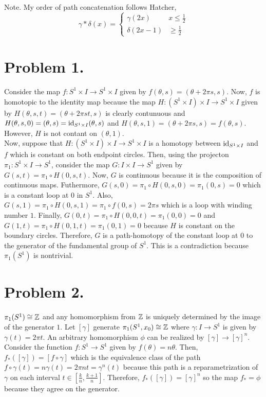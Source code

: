 \documentclass[12pt]{extarticle}
\begin{document}

Note. My order of path concatenation follows Hatcher,
\[\gamma * \delta(x) = \begin{cases}
\gamma(2x) & x \le \tfrac{1}{2} \\
\delta(2x - 1) & \ge \tfrac{1}{2}
\end{cases}\]
 
\section*{Problem 1.}
Consider the map $f : S^1 \times I \to S^1 \times I$ given by $f(\theta, s) = (\theta + 2 \pi s, s)$. Now, $f$ is homotopic to the identity map because the map $H : (S^1 \times I) \times I \to S^1 \times I$ given by $H(\theta, s, t) = (\theta + 2\pi st, s)$ is clearly contunuous and $H(\theta, s, 0) = (\theta, s) = \mathrm{id}_{S^1 \times I}(\theta, s)$ and $H(\theta, s, 1) = (\theta + 2 \pi s, s) = f(\theta, s)$. However, $H$ is not contant on $(\theta, 1)$. \bigskip \\
Now, suppose that $H : (S^1 \times I) \times I \to S^1 \times I$ is a homotopy between $\mathrm{id}_{S^1 \times I}$ and $f$ which is constant on both endpoint circles. Then, using the projecton $\pi_1 : S^1 \times I \to S^1$, consider the map $G : I \times I \to S^1$ given by $G(s, t) = \pi_1 \circ H(0, s, t)$. Now, $G$ is continuous because it is the composition of continuous maps. Futhermore, $G(s, 0) = \pi_1 \circ H(0, s, 0) = \pi_1(0, s) = 0$ which is a constant loop at $0$ in $S^1$. Also, $G(s, 1) = \pi_1 \circ H(0, s, 1) = \pi_1 \circ f(0, s) = 2 \pi s$ which is a loop with winding number $1$. Finally, $G(0, t) = \pi_1 \circ H(0, 0, t) = \pi_1(0, 0) = 0$ and $G(1, t) = \pi_1 \circ H(0, 1, t) = \pi_1(0, 1) = 0$ because $H$ is constant on the boundary circles. Therefore, $G$ is a path-homotopy of the constant loop at $0$ to the generator of the fundamental group of $S^1$. This is a contradiction because $\pi_1(S^1)$ is nontrivial.   

\section*{Problem 2.}
$\pi_1(S^1) \cong \mathbb{Z}$ and any homomorphism from $\mathbb{Z}$ is uniquely determined by the image of the generator $1$. Let $[\gamma]$ generate $\pi_1(S^1, x_0) \cong \mathbb{Z}$ where $\gamma : I \to S^1$ is given by $\gamma(t) = 2 \pi t$. An arbitrary homomorphism $\phi$ can be realized by $[\gamma] \to [\gamma]^n$. Consider the function $f : S^1 \to S^1$ given by $f(\theta) = n \theta$. Then, $f_*([\gamma]) = [f \circ \gamma]$ which is the equivalence class of the path $f \circ \gamma(t) = n \gamma(t) = 2 \pi n t = \gamma^n(t)$ because this path is a reparametrization of $\gamma$ on each interval $t \in [\tfrac{k}{n}, \tfrac{k+1}{n}]$. Therefore, $f_*([\gamma]) = [\gamma]^n$ so the map $f_* = \phi$ because they agree on the generator.
\end{document}
